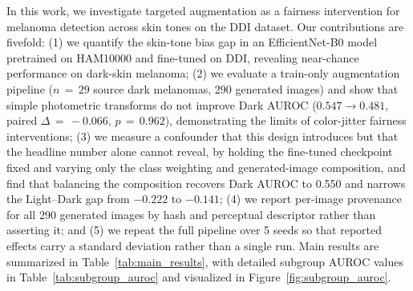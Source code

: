 In this work, we investigate targeted augmentation as a fairness intervention for melanoma detection across skin tones on the DDI dataset. Our contributions are fivefold: (1) we quantify the skin-tone bias gap in an EfficientNet-B0 model pretrained on HAM10000 and fine-tuned on DDI, revealing near-chance performance on dark-skin melanoma; (2) we evaluate a train-only augmentation pipeline ($n\,{=}\,29$ source dark melanomas, 290 generated images) and show that simple photometric transforms do not improve Dark AUROC ($0.547 \to 0.481$, paired $\Delta\,{=}\,-0.066$, $p\,{=}\,0.962$), demonstrating the limits of color-jitter fairness interventions; (3) we measure a confounder that this design introduces but that the headline number alone cannot reveal, by holding the fine-tuned checkpoint fixed and varying only the class weighting and generated-image composition, and find that balancing the composition recovers Dark AUROC to 0.550 and narrows the Light--Dark gap from $-0.222$ to $-0.141$; (4) we report per-image provenance for all 290 generated images by hash and perceptual descriptor rather than asserting it; and (5) we repeat the full pipeline over 5 seeds so that reported effects carry a standard deviation rather than a single run. Main results are summarized in Table~\ref{tab:main_results}, with detailed subgroup AUROC values in Table~\ref{tab:subgroup_auroc} and visualized in Figure~\ref{fig:subgroup_auroc}.
